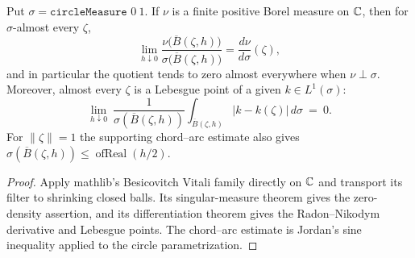 \begin{theorem}
  \label{thm:circle_differentiation}
  \leanok
  Put $\sigma=\texttt{circleMeasure }0\ 1$. If $\nu$ is a finite positive
  Borel measure on $\mathbb{C}$, then for $\sigma$-almost every $\zeta$,
  \[
    \lim_{h\downarrow0}
      \frac{\nu\bigl(\overline B(\zeta,h)\bigr)}
           {\sigma\bigl(\overline B(\zeta,h)\bigr)}
      =\frac{d\nu}{d\sigma}(\zeta),
  \]
  and in particular the quotient tends to zero almost everywhere when
  $\nu\perp\sigma$. Moreover, almost every $\zeta$ is a Lebesgue point of a
  given $k\in L^1(\sigma)$:
  \[
    \lim_{h\downarrow0}\ \frac{1}{\sigma(\overline B(\zeta,h))}
      \int_{\overline B(\zeta,h)}|k-k(\zeta)|\,d\sigma\ =\ 0.
  \]
  For $\|\zeta\|=1$ the supporting chord--arc estimate also gives
  $\sigma(\overline B(\zeta,h))\le \operatorname{ofReal}(h/2)$.
  \begin{proof}
    \leanok
    Apply mathlib's Besicovitch Vitali family directly on $\mathbb{C}$ and transport
    its filter to shrinking closed balls. Its singular-measure theorem gives
    the zero-density assertion, and its differentiation theorem gives the
    Radon--Nikodym derivative and Lebesgue points. The chord--arc estimate is
    Jordan's sine inequality applied to the circle parametrization.
  \end{proof}
\end{theorem}

